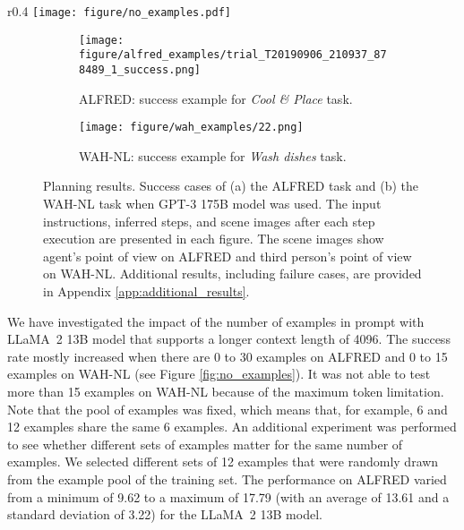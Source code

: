 \begin{wrapfigure}[11]{r}{0.4\textwidth}
\centering
\vspace{-6mm}
\texttt{[image: figure/no\_examples.pdf]}
\vspace{-6mm}
\caption{(Subgoal) success rates for the different number of examples for in-context learning.}
\label{fig:no_examples}
\end{wrapfigure}

\begin{figure}[h!]
\centering
\begin{subfigure}{\textwidth}
    \centering
    \caption{ALFRED: success example for \textit{Cool \& Place} task.}
    \texttt{[image: figure/alfred\_examples/trial\_T20190906\_210937\_878489\_1\_success.png]}
\end{subfigure}
\begin{subfigure}{\textwidth}
    \centering
    \caption{WAH-NL: success example for \textit{Wash dishes} task.}
    \texttt{[image: figure/wah\_examples/22.png]}
\end{subfigure}
\caption{Planning results. Success cases of (a) the ALFRED task and (b) the WAH-NL task when GPT-3 175B model was used. The input instructions, inferred steps, and scene images after each step execution are presented in each figure. The scene images show agent's point of view on ALFRED and third person's point of view on WAH-NL. Additional results, including failure cases, are provided in Appendix \ref{app:additional_results}.}
\label{fig:sample_results}
\end{figure}

We have investigated the impact of the number of examples in prompt with LLaMA~2 13B model that supports a longer context length of 4096. The success rate mostly increased when there are 0 to 30 examples on ALFRED and 0 to 15 examples on WAH-NL (see Figure \ref{fig:no_examples}). It was not able to test more than 15 examples on WAH-NL because of the maximum token limitation. Note that the pool of examples was fixed, which means that, for example, 6 and 12 examples share the same 6 examples. An additional experiment was performed to see whether different sets of examples matter for the same number of examples. We selected different sets of 12 examples that were randomly drawn from the example pool of the training set. The performance on ALFRED varied from a minimum of 9.62 to a maximum of 17.79 (with an average of 13.61 and a standard deviation of 3.22) for the LLaMA~2 13B model.

